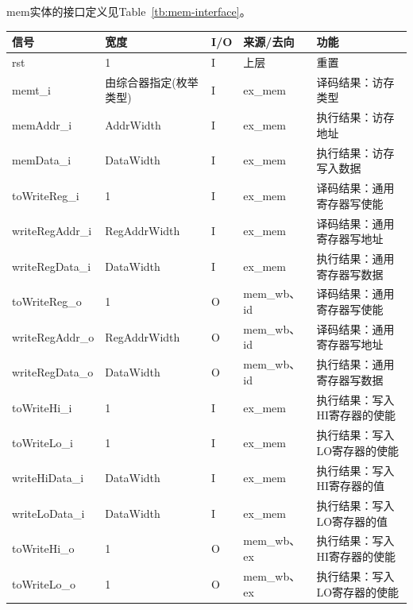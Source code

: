 \documentclass{article}
\begin{document}
\begin{spacing}{1.4}
mem实体的接口定义见Table~\ref{tb:mem-interface}。
\begin{longtable}{l|l|l|l|p{5cm}}
\hline
\textbf{信号}&\textbf{宽度}&\textbf{I/O}&\textbf{来源/去向}&\textbf{功能} \\
\hline \endhead rst            & 1                      & I     & 上层          & 重置 \\
\hline memt\_i                 & 由综合器指定(枚举类型) & I     & ex\_mem       & 译码结果：访存类型 \\
\hline memAddr\_i              & AddrWidth              & I     & ex\_mem       & 执行结果：访存地址 \\
\hline memData\_i              & DataWidth              & I     & ex\_mem       & 执行结果：访存写入数据 \\
\hline toWriteReg\_i           & 1                      & I     & ex\_mem       & 译码结果：通用寄存器写使能 \\
\hline writeRegAddr\_i         & RegAddrWidth           & I     & ex\_mem       & 译码结果：通用寄存器写地址 \\
\hline writeRegData\_i         & DataWidth              & I     & ex\_mem       & 执行结果：通用寄存器写数据 \\
\hline toWriteReg\_o           & 1                      & O     & mem\_wb、id   & 译码结果：通用寄存器写使能 \\
\hline writeRegAddr\_o         & RegAddrWidth           & O     & mem\_wb、id   & 译码结果：通用寄存器写地址 \\
\hline writeRegData\_o         & DataWidth              & O     & mem\_wb、id   & 执行结果：通用寄存器写数据 \\
\hline toWriteHi\_i            & 1                      & I     & ex\_mem       & 执行结果：写入HI寄存器的使能 \\
\hline toWriteLo\_i            & 1                      & I     & ex\_mem       & 执行结果：写入LO寄存器的使能 \\
\hline writeHiData\_i          & DataWidth              & I     & ex\_mem       & 执行结果：写入HI寄存器的值 \\
\hline writeLoData\_i          & DataWidth              & I     & ex\_mem       & 执行结果：写入LO寄存器的值 \\
\hline toWriteHi\_o            & 1                      & O     & mem\_wb、ex   & 执行结果：写入HI寄存器的使能 \\
\hline toWriteLo\_o            & 1                      & O     & mem\_wb、ex   & 执行结果：写入LO寄存器的使能 \\

\end{longtable}
\end{spacing}
\end{document}
